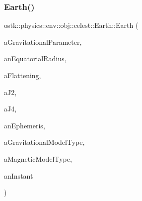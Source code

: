 \subsubsection{\texorpdfstring{Earth()}{Earth()}\hspace{0.1cm}{\footnotesize\ttfamily [1/2]}}
{\footnotesize\ttfamily ostk\+::physics\+::env\+::obj\+::celest\+::\+Earth\+::\+Earth (\begin{DoxyParamCaption}\item[{const \hyperlink{classostk_1_1physics_1_1units_1_1_derived}{Derived} \&}]{a\+Gravitational\+Parameter,  }\item[{const \hyperlink{classostk_1_1physics_1_1units_1_1_length}{Length} \&}]{an\+Equatorial\+Radius,  }\item[{const Real \&}]{a\+Flattening,  }\item[{const Real \&}]{a\+J2,  }\item[{const Real \&}]{a\+J4,  }\item[{const Shared$<$ \hyperlink{classostk_1_1physics_1_1env_1_1_ephemeris}{Ephemeris} $>$ \&}]{an\+Ephemeris,  }\item[{const \hyperlink{classostk_1_1physics_1_1environment_1_1gravitational_1_1_earth_a9895df78b5c5aab5e981bf765f8c0f05}{Earth\+Gravitational\+Model\+::\+Type} \&}]{a\+Gravitational\+Model\+Type,  }\item[{const \hyperlink{classostk_1_1physics_1_1environment_1_1magnetic_1_1_earth_a30a064d87b6fce338e76aebd3043b6b6}{Earth\+Magnetic\+Model\+::\+Type} \&}]{a\+Magnetic\+Model\+Type,  }\item[{const \hyperlink{classostk_1_1physics_1_1time_1_1_instant}{Instant} \&}]{an\+Instant }\end{DoxyParamCaption})}

\mbox{\label{classostk_1_1physics_1_1env_1_1obj_1_1celest_1_1_earth_acf1ba88a7e9747779807a0ac676efc99}} 
